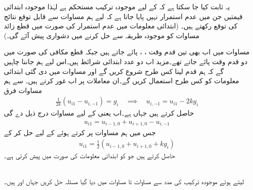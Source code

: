 یہ ثابت کیا جا سکتا ہے کہ  کے لیے موجودہ ترکیب مستحکم ہے لہٰذا موجودہ ابتدائی قیمتیں جن میں عدم استمرار نہیں پایا جاتا ہے کہ لیے ہم مساوات  سے  قابل توقع نتائج کی توقع رکھتے ہیں۔ (ابتدائی معلومات میں عدم استمرار کی صورت میں قطع زائد مساوات کو موجودہ طریقہ سے حل کرنے میں دشواری پیش آئے گی۔)

مساوات  میں اب بھی تین قدم وقت ، ،  پائے جاتے ہیں جبکہ قطع مکافی کی صورت میں دو قدم وقت پائے جاتے تھے۔مزید اب دو عدد ابتدائی شرائط ہیں۔اس لیے ہم جاننا چاہیں گے کہ ہم قدم لینا کس طرح شروع کریں گے  اور مساوات  میں دی گئی ابتدائی معلومات کو کس طرح استعمال کریں گے۔ان معاملات پر اب غور کرتے ہیں۔ سے ہم مساوات فرق
\begin{align}\label{مساوات_اعدادی_موج_ج}
\frac{1}{2k}(u_{i1}-u_{i,-1})=g_i \quad \implies \quad u_{i,-1}=u_{i1}-2kg_i
\end{align}
حاصل کرتے ہیں جہاں  ہے۔اب  یعنی  کے لیے مساوات  درج ذیل دے گی
\begin{align*}
u_{i1}=u_{i-1,0}+u_{i+1,0}-u_{i,-1}
\end{align*}
جس میں ہم مساوات  پر کرتے ہوئے  کے لیے حل کر کے
\begin{align}\label{مساوات_اعدادی_موج_چ}
u_{i1}=\frac{1}{2}(u_{i-1,0}+u_{i+1,0}+kg_i)
\end{align}
حاصل کرتے ہیں جو  کو ابتدائی معلومات کی صورت میں پیش کرتی ہے۔

\quad {}\\
 لیتے ہوئے موجودہ ترکیب کی  مدد سے مساوات  تا مساوات  میں دیا گیا مسئلہ حل کریں جہاں  اور  ہیں۔ 

